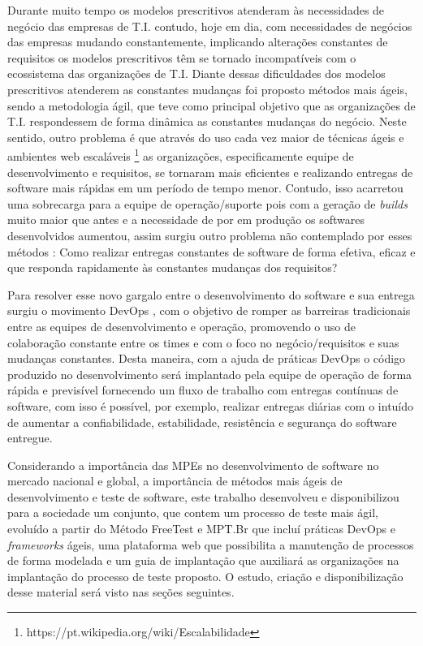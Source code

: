 Durante muito tempo os modelos prescritivos atenderam às necessidades de negócio das empresas de T.I. contudo, hoje em dia, com necessidades de negócios das empresas mudando constantemente, implicando alterações constantes de requisitos os modelos prescritivos têm se tornado incompatíveis com o ecossistema das organizações de T.I. Diante dessas dificuldades dos modelos prescritivos atenderem as constantes mudanças foi proposto métodos mais ágeis, sendo a metodologia ágil, que teve como principal objetivo que as organizações de T.I. respondessem de forma dinâmica as constantes mudanças do negócio. Neste sentido, outro problema é que através do uso cada vez maior de técnicas ágeis e ambientes web escaláveis \footnote{https://pt.wikipedia.org/wiki/Escalabilidade} as organizações, especificamente equipe de desenvolvimento e requisitos, se tornaram mais eficientes e realizando entregas de software mais rápidas em um período de tempo menor. Contudo, isso acarretou uma sobrecarga para a equipe de operação/suporte pois com a geração de \textit{builds} muito maior que antes e a necessidade de por em produção os softwares desenvolvidos aumentou, assim surgiu outro problema não contemplado por esses métodos \cite{BRAGA2015}: Como realizar entregas constantes de software de forma efetiva, eficaz e que responda rapidamente às constantes mudanças dos requisitos?

Para resolver esse novo gargalo entre o desenvolvimento do software e sua entrega surgiu o movimento DevOps \cite{Debois2008}, com o objetivo de romper as barreiras tradicionais entre as equipes de desenvolvimento e operação, promovendo o uso de colaboração constante entre os times e com o foco no negócio/requisitos e suas mudanças constantes. Desta maneira, com a ajuda de práticas DevOps o código produzido no desenvolvimento será implantado pela equipe de operação de forma rápida e previsível fornecendo um fluxo de trabalho com entregas contínuas de software, com isso é possível, por exemplo, realizar entregas diárias com o intuído de aumentar a confiabilidade, estabilidade, resistência e segurança do software entregue.


Considerando a importância das MPEs no desenvolvimento de software no mercado nacional e global, a importância de métodos mais ágeis de desenvolvimento e teste de software, este trabalho desenvolveu e disponibilizou para a sociedade um conjunto, que contem um processo de teste mais ágil, evoluído a partir do Método FreeTest \cite{Camilo-junior2012} e MPT.Br \cite{GuiaMPTbr} que incluí práticas DevOps e \textit{frameworks} ágeis, uma plataforma web que possibilita a manutenção de processos de forma modelada e um guia de implantação que auxiliará as organizações na implantação do processo de teste proposto. O estudo, criação e disponibilização desse material será visto nas seções seguintes.

